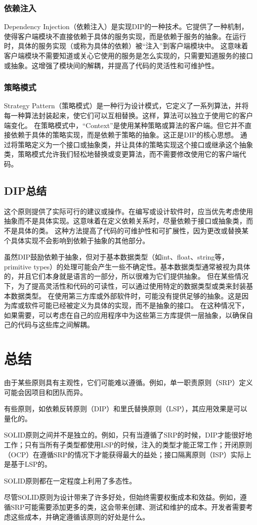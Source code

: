 \subsubsection{依赖注入}
Dependency Injection（依赖注入）是实现DIP的一种技术。它提供了一种机制，使得客户端模块不直接依赖于具体的服务实现，而是依赖于服务的抽象。在运行时，具体的服务实现（或称为具体的依赖）被“注入”到客户端模块中。
这意味着客户端模块不需要知道或关心它使用的服务是怎么实现的，只需要知道服务的接口或抽象。这增强了模块间的解耦，并提高了代码的灵活性和可维护性。

\subsubsection{策略模式}

Strategy Pattern（策略模式）是一种行为设计模式，它定义了一系列算法，并将每一种算法封装起来，使它们可以互相替换。这样，算法可以独立于使用它的客户端变化。
在策略模式中，“Context”是使用某种策略或算法的客户端。但它并不直接依赖于具体的策略实现，而是依赖于策略的抽象。这正是DIP的核心思想。
通过将策略定义为一个接口或抽象类，并让具体的策略实现这个接口或继承这个抽象类，策略模式允许我们轻松地替换或变更算法，而不需要修改使用它的客户端代码。

\subsection{DIP总结}

这个原则提供了实际可行的建议或操作。在编写或设计软件时，应当优先考虑使用抽象而不是具体实现。这意味着在定义依赖关系时，尽量依赖于接口或抽象类，而不是具体的类。
这种方法提高了代码的可维护性和可扩展性，因为更改或替换某个具体实现不会影响到依赖于抽象的其他部分。

虽然DIP鼓励依赖于抽象，但对于基本数据类型（如int、float、string等，primitive types）的处理可能会产生一些不确定性。基本数据类型通常被视为具体的，并且它们本身就是语言的一部分，所以很难为它们提供抽象。
但在某些情况下，为了提高灵活性和代码的可读性，可以通过使用特定的数据类型或类来封装基本数据类型。
在使用第三方库或外部软件时，可能没有提供足够的抽象。这是因为库或软件可能已经被定义为具体的实现，而不是抽象的接口。
在这种情况下，如果需要，可以考虑在自己的应用程序中为这些第三方库提供一层抽象，以确保自己的代码与这些库之间解耦。


\section{总结}

由于某些原则具有主观性，它们可能难以遵循。例如，单一职责原则（SRP）定义可能会因项目和团队而异。

有些原则，如依赖反转原则（DIP）和里氏替换原则（LSP），其应用效果是可以量化的。

SOLID原则之间并不是独立的。例如，只有当遵循了SRP的时候，DIP才能很好地工作；只有当所有子类型都使用LSP的时候，注入的类型才能正常工作；开闭原则（OCP）在遵循SRP的情况下才能获得最大的益处；接口隔离原则（ISP）实际上是基于LSP的。

SOLID原则都在一定程度上利用了多态性。

尽管SOLID原则为设计带来了许多好处，但始终需要权衡成本和效益。例如，遵循SRP可能需要添加更多的类，这会带来创建、测试和维护的成本。开发者需要考虑这些成本，并确定遵循该原则的好处是什么。






